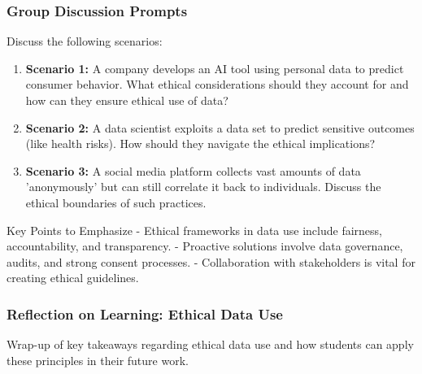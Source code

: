 \documentclass[aspectratio=169]{beamer}
\begin{document}
\begin{frame}[fragile]
    \frametitle{Group Discussion Prompts}
    Discuss the following scenarios:
    
    \begin{enumerate}
        \item \textbf{Scenario 1:} A company develops an AI tool using personal data to predict consumer behavior. What ethical considerations should they account for and how can they ensure ethical use of data?
        
        \item \textbf{Scenario 2:} A data scientist exploits a data set to predict sensitive outcomes (like health risks). How should they navigate the ethical implications?
        
        \item \textbf{Scenario 3:} A social media platform collects vast amounts of data 'anonymously' but can still correlate it back to individuals. Discuss the ethical boundaries of such practices.
    \end{enumerate}
    
    \begin{block}{Key Points to Emphasize}
        - Ethical frameworks in data use include fairness, accountability, and transparency.
        - Proactive solutions involve data governance, audits, and strong consent processes.
        - Collaboration with stakeholders is vital for creating ethical guidelines.
    \end{block}
\end{frame}

\begin{frame}[fragile]
    \frametitle{Reflection on Learning: Ethical Data Use}
    Wrap-up of key takeaways regarding ethical data use and how students can apply these principles in their future work.
\end{frame}
\end{document}
